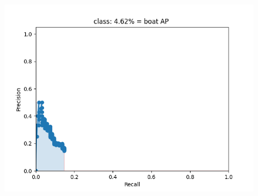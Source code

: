 \documentclass{article}%
\begin{document}
\begin{figure}[H]
\begin{minipage}{0.24\linewidth}
	\end{minipage}
    \begin{minipage}{0.24\linewidth}
		\centering
		\includegraphics[width=0.9\linewidth]{fast_rcnn/mAP_output/classes/boat.png}
	\end{minipage}
\end{figure}
\end{document}
